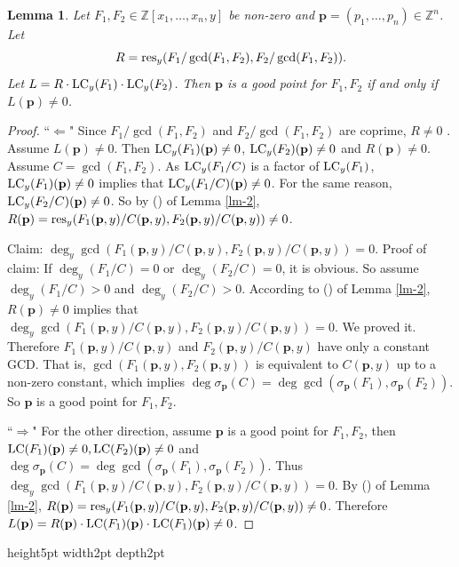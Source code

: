 \documentclass[final,20pt]{elsarticle}
\newtheorem{lemma}[theorem]{Lemma}
\def\Z{{\mathbb Z}}
\def\res{\hbox{\rm{res}}}
\def\LC{\hbox{\rm{LC}}}
\def\qed{\hfil {\vrule height5pt width2pt depth2pt}}
\begin{document}
\begin{lemma}\label{the-13}
Let $F_1,F_2\in \Z[x_1,\dots,x_n,y]$ be non-zero and $\mathbf{p}=(p_1,\dots,p_n)\in \Z^n$. {\color{blue}Let} $$R=\res_y(F_1/\gcd(F_1,F_2),F_2/\gcd(F_1,F_2)).$$ Let $L=R\cdot \LC_y(F_1)\cdot \LC_y(F_2)$. Then
$\mathbf{p}$ is a good point for $F_1,F_2$ if and only if $L(\mathbf{p})\neq 0$.
\end{lemma}
\begin{proof}
``$\Longleftarrow$" Since $F_1/\gcd(F_1,F_2)$ and $F_2/\gcd(F_1,F_2)$ are coprime, $R\neq 0$ \cite[p288, Sylvester's Criterion]{Geddes92Algorithms}.
Assume $L(\mathbf{p})\neq 0$. Then $\LC_y(F_1)(\mathbf{p})\neq 0$, $\LC_y(F_2)(\mathbf{p})\neq 0$ and $R(\mathbf{p})\neq 0$. Assume $C=\gcd(F_1,F_2)$.
%
As $\LC_y(F_1/C)$ is a factor of $\LC_y(F_1)$, $\LC_y(F_1)(\mathbf{p})\neq 0$ implies that $\LC_y(F_1/C)(\mathbf{p})\neq 0$. For the same reason, $\LC_y(F_2/C)(\mathbf{p})\neq 0$. So by (\lowercase\expandafter{}) of Lemma \ref{lm-2}, $R(\mathbf{p})=\res_y(F_1(\mathbf{p},y)/C(\mathbf{p},y),F_2(\mathbf{p},y)/C(\mathbf{p},y))\neq 0$.

Claim: $\deg_y \gcd(F_1(\mathbf{p},y)/C(\mathbf{p},y), F_2(\mathbf{p},y)/C(\mathbf{p},y))=0$.
%
Proof of claim: If $\deg_y(F_1/C)=0$ or $\deg_y(F_2/C)=0$, it is obvious. So assume $\deg_y(F_1/C)>0$ and $\deg_y(F_2/C)>0$.
%
According to (\lowercase\expandafter{}) of Lemma \ref{lm-2}, $R(\mathbf{p})\neq 0$ implies that
%
$\deg_y\gcd(F_1(\mathbf{p},y)/C(\mathbf{p},y), F_2(\mathbf{p},y)/C(\mathbf{p},y))=0$. We proved it.
Therefore
 $F_1(\mathbf{p},y)/C(\mathbf{p},y)$ and $F_2(\mathbf{p},y)/C(\mathbf{p},y)$ have only a constant GCD. That is, $\gcd(F_1(\mathbf{p},y),F_2(\mathbf{p},y))$ is equivalent to $C(\mathbf{p},y)$ up to a non-zero constant,
%
which implies $\deg \sigma_\mathbf{p}(C) =\deg \gcd(\sigma_\mathbf{p}(F_1),\sigma_\mathbf{p}(F_2))$.
So $\mathbf{p}$ is a good point for $F_1,F_2$.

``$\Longrightarrow$" For the other direction, assume $\mathbf{p}$ is a good point for $F_1,F_2$, then $\LC(F_1)(\mathbf{p})\neq 0, \LC(F_2)(\mathbf{p})\neq 0$ and $\deg \sigma_\mathbf{p}(C) =\deg \gcd(\sigma_\mathbf{p}(F_1),\sigma_\mathbf{p}(F_2))$.
 Thus $\deg_y\gcd(F_1(\mathbf{p},y)/C(\mathbf{p},y), F_2(\mathbf{p},y)/C(\mathbf{p},y))=0$. By (\lowercase\expandafter{}) of Lemma \ref{lm-2}, $R(\mathbf{p})=\res_y(F_1(\mathbf{p},y)/C(\mathbf{p},y),F_2(\mathbf{p},y)/C(\mathbf{p},y))\neq 0$. Therefore $L(\mathbf{p})=R(\mathbf{p})\cdot \LC(F_1)(\mathbf{p})\cdot \LC(F_1)(\mathbf{p})\neq 0$.
\end{proof}\qed
\end{document}
